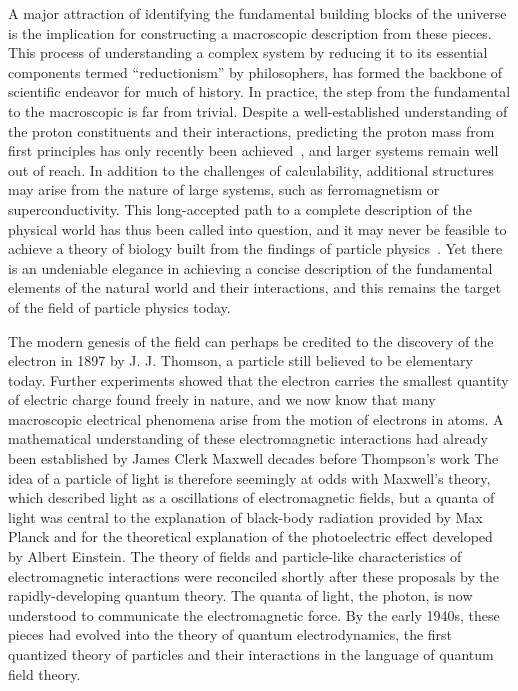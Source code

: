 A major attraction of identifying the fundamental building blocks of the universe
is the implication for constructing a macroscopic description from these
pieces. This process of understanding a complex system 
by reducing it to its essential components
termed ``reductionism'' by philosophers, 
has formed the backbone of scientific endeavor for much of history.
In practice, the step from the fundamental to the macroscopic 
is far from trivial. Despite a well-established
understanding of the proton constituents and their interactions,
predicting the proton mass from first principles has only recently 
been achieved~\cite{Durr:2008zz}, and larger systems remain well
out of reach.
In addition to the challenges of calculability, additional structures
may arise from the nature of large systems, such as ferromagnetism or 
superconductivity.
This long-accepted path to a complete description of the physical world
has thus been called into question, and it may never be feasible
to achieve a theory of biology built from the findings of particle 
physics~\cite{Anderson393}.
Yet there is an undeniable elegance in achieving a concise description
of the fundamental elements of the natural world and their interactions,
and this remains the target of the field of particle physics today. 

The modern genesis of the field can perhaps be credited to 
the discovery of the electron in 1897 by J. J. Thomson, a particle still
believed to be elementary today.
Further experiments showed that the electron carries the smallest quantity of electric charge found
freely in nature, and we now know that many macroscopic electrical phenomena
arise from the motion of electrons in atoms.
A mathematical understanding of these electromagnetic interactions had 
already been established by James Clerk Maxwell decades before Thompson's work
The idea of a particle of light is therefore seemingly at odds with Maxwell's theory,
which described light as a oscillations of electromagnetic fields,
but a quanta of light was central to the explanation of black-body radiation provided by Max Planck 
and for the theoretical explanation of the photoelectric effect developed by Albert Einstein.
The theory of fields and particle-like characteristics of electromagnetic
interactions were reconciled shortly after these proposals by the 
rapidly-developing quantum theory.
The quanta of light, the photon, is now understood to communicate the electromagnetic force.
By the early 1940s, these pieces had evolved into the theory of quantum 
electrodynamics, the first
quantized theory of particles and their interactions in the language 
of quantum field theory. 

